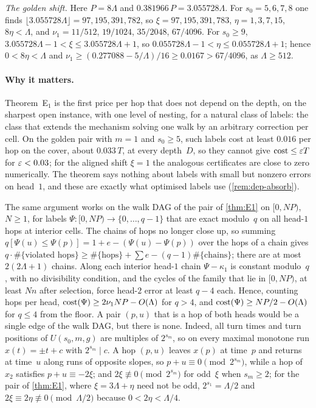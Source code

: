 \begin{informalproof}
\emph{The golden shift.} Here $P=8\Lambda$ and $0.381966\,P=3.055728\Lambda$. For $s_0=5,6,7,8$ one finds
$\lfloor3.055728\Lambda\rfloor=97,195,391,782$, so $\xi=97,195,391,783$, $\eta=1,3,7,15$, $8\eta<\Lambda$, and
$\nu_1=11/512$, $19/1024$, $35/2048$, $67/4096$. For $s_0\ge9$, $3.055728\Lambda-1<\xi\le3.055728\Lambda+1$, so
$0.055728\Lambda-1<\eta\le0.055728\Lambda+1$; hence $0<8\eta<\Lambda$ and
$\nu_1\ge(0.277088-5/\Lambda)/16\ge0.0167>67/4096$, as $\Lambda\ge512$.
\end{informalproof}

\paragraph{Why it matters.} Theorem~E$_1$ is the first price per hop that does not depend on the depth, on the
sharpest open instance, with one level of nesting, for a natural class of labels: the class that extends the mechanism solving one walk by an
arbitrary correction per cell. On the golden pair with $m=1$ and $s_0\ge5$, such labels cost at least $0.016$ per hop on the cover, about
$0.033\,T$, at every depth~$D$, so they cannot give $\mathrm{cost}\le\varepsilon T$ for $\varepsilon<0.03$; for the aligned shift $\xi=1$ the
analogous certificates are close to zero numerically. The theorem says nothing about labels with small but nonzero
errors on
head~$1$, and these are exactly what optimised labels use (\cref{rem:dep-absorb}).

\begin{remark}\label{rem:dep-linear}
The same argument works on the walk DAG of the pair of \cref{thm:E1} on $[0,NP)$, $N\ge1$, for labels
$\Psi\colon[0,NP)\to\{0,\dots,q-1\}$ that are exact modulo~$q$ on all head-$1$ hops at interior cells. The chains of
hops no longer close up, so summing $q[\Psi(u)\le\Psi(p)]=1+e-(\Psi(u)-\Psi(p))$ over the hops of a chain gives
$q\cdot\#\{\text{violated hops}\}\ge\#\{\text{hops}\}+\sum e-(q-1)\#\{\text{chains}\}$; there are at most
$2(2\Lambda+1)$ chains. Along each interior head-$1$ chain
$\Psi-\kappa_1$ is constant modulo~$q$, with no divisibility condition, and the cycles of the family that lie in
$[0,NP)$, at least $Nn$ after selection, force head-$2$ error at least $q-4$ each. Hence, counting hops per head,
$\mathrm{cost}(\Psi)\ge2\nu_1NP-O(\Lambda)$ for $q>4$, and $\mathrm{cost}(\Psi)\ge NP/2-O(\Lambda)$ for $q\le4$ from the floor. A
pair $(p,u)$ that is a hop of both heads would be a single edge of the walk DAG, but there is none. Indeed, all turn
times and turn positions of $U(s_0,m,g)$ are multiples of $2^{s_m}$, so on every maximal monotone run $x(t)=\pm t+c$
with $2^{s_m}\mid c$. A hop $(p,u)$ leaves $x(p)$ at time~$p$ and returns at time~$u$ along runs of opposite slopes,
so $p+u\equiv0\pmod{2^{s_m}}$, while a hop of $x_2$ satisfies $p+u\equiv-2\xi$; and $2\xi\not\equiv0\pmod{2^{s_m}}$ for
odd~$\xi$ when $s_m\ge2$; for the pair of \cref{thm:E1}, where $\xi=3\Lambda+\eta$ need not be odd, $2^{s_1}=\Lambda/2$
and $2\xi\equiv2\eta\not\equiv0\pmod{\Lambda/2}$ because $0<2\eta<\Lambda/4$.
\end{remark}

